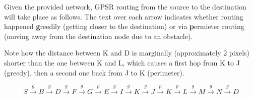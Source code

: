 \documentclass[a4paper]{scrreprt}
\begin{document}
Given the provided network, GPSR routing from the source to the destination
will take place as follows. The text over each arrow indicates whether routing
happened \textbf{g}reedily (getting closer to the destination) or via
\textbf{p}ermieter routing (moving away from the destination node due to an
obstacle).

Note how the distance between K and D is marginally (approximately 2 pixels)
shorter than the one between K and L, which causes a first hop from K to J
(greedy), then a second one back from J to K (perimeter).

\[
		S \xrightarrow{g} B \xrightarrow{g} D \xrightarrow{g} F \xrightarrow{g}
		G \xrightarrow{p} E \xrightarrow{g} I \xrightarrow{g} K \xrightarrow{g}
		J \xrightarrow{p} K \xrightarrow{p} L \xrightarrow{g} M \xrightarrow{g}
		N \xrightarrow{g} D
\]
\end{document}
